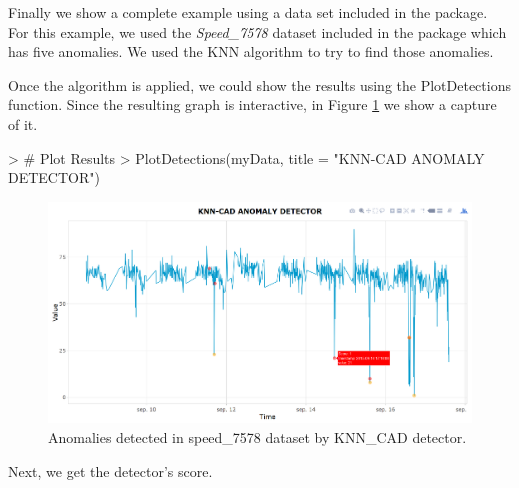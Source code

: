 \documentclass[a4paper]{article}
\begin{document}
Finally we show a complete example using a data set included in the package. For this example, we used the \emph{Speed\_7578} dataset included in the package which has five anomalies. We used the KNN algorithm to try to find those anomalies.

\begin{Schunk}
\end{Schunk}

Once the algorithm is applied, we could show the results using the PlotDetections function. Since the resulting graph is interactive, in Figure \ref{fig:Example1Score} we show a capture of it.

\begin{Schunk}
\begin{Sinput}
> # Plot Results
> PlotDetections(myData, title = "KNN-CAD ANOMALY DETECTOR")
\end{Sinput}
\end{Schunk}

\begin{figure}[htbp]
\centering
\includegraphics[width=1\linewidth]{Example1Score.PNG}
\caption{Anomalies detected in speed\_7578 dataset by KNN\_CAD detector.}
\label{fig:Example1Score}
\end{figure}


Next, we get the detector's score.
\end{document}
